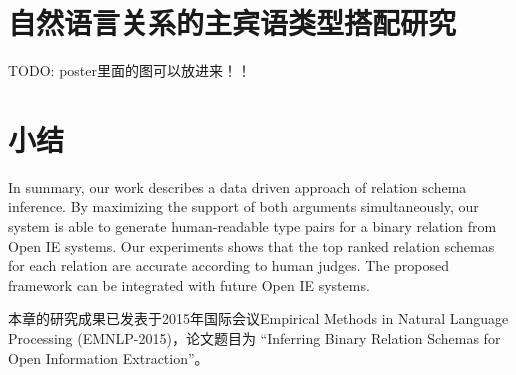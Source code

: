 \section{自然语言关系的主宾语类型搭配研究}
\label{sec:tinf}

TODO: poster里面的图可以放进来！！



%




\section{小结}
In summary, our work describes a data driven approach of
relation schema inference.
By maximizing the support of both arguments simultaneously,
our system is able to generate human-readable type pairs for 
a binary relation from Open IE systems. 
Our experiments shows that the top ranked relation schemas for 
each relation are accurate according to human judges.
The proposed framework can be integrated with future Open IE systems.


本章的研究成果已发表于2015年国际会议Empirical Methods in Natural Language Processing
(EMNLP-2015)，论文题目为
``Inferring Binary Relation Schemas for Open Information Extraction''。
